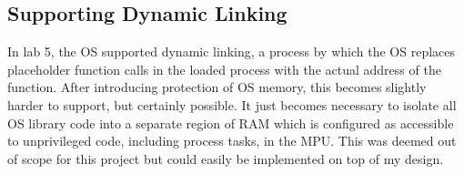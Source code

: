 \subsection{Supporting Dynamic Linking}

In lab 5, the OS supported dynamic linking, a process by which the OS replaces placeholder function calls in the loaded process with the actual address of the function. After introducing protection of OS memory, this becomes slightly harder to support, but certainly possible. It just becomes necessary to isolate all OS library code into a separate region of RAM which is configured as accessible to unprivileged code, including process tasks, in the MPU. This was deemed out of scope for this project but could easily be implemented on top of my design.
